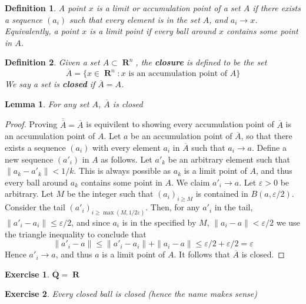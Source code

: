 \documentclass{report}
\newtheorem{lemma}[theorem]{Lemma}
\newtheorem{definition}{Definition}
\newtheorem{exercise}{Exercise}
\DeclareMathOperator{\real}{\mathbf{R}}
\begin{document}
\begin{definition}
  A point $x$ is a limit or accumulation point of a set $A$ if there exists a sequence $(a_i)$ such that every element is in the set $A$, and $a_i \to x$. Equivalently, a point $x$ is a limit point if every ball around $x$ contains some point in $A$.
\end{definition}

\begin{definition}
  Given a set $A \subset \real^n$, the {\bf closure} is defined to be the set
  \[ \overline{A} = \{ x \in \real^n : \text{$x$ is an accumulation point of $A$} \} \]
  We say a set is {\bf closed} if $\overline{A} = A$.
\end{definition}

\begin{lemma}
  For any set $A$, $\overline{A}$ is closed
\end{lemma}
\begin{proof}
  Proving $\overline{\overline{A}} = \overline{A}$ is equivilent to showing every accumulation point of $\overline{A}$ is an accumulation point of $A$. Let $a$ be an accumulation point of $\overline{A}$, so that there exists a sequence $(a_i)$ with every element $a_i$ in $\overline{A}$ such that $a_i \to a$. Define a new sequence $(a'_i)$ in $A$ as follows. Let $a'_k$ be an arbitrary element such that $\| a_k - a'_k \| < 1/k$. This is always possible as $a_k$ is a limit point of $A$, and thus every ball around $a_k$ contains some point in $A$. We claim $a'_i \to a$. Let $\varepsilon > 0$ be arbitrary. Let $M$ be the integer such that $(a_i)_{i \geq M}$ is contained in $B(a,\varepsilon/2)$. Consider the tail $(a'_i)_{i \geq \max(M,1/2\varepsilon)}$. Then, for any $a'_i$ in the tail, $\| a'_i - a_i \| \leq \varepsilon/2$, and since $a_i$ is in the specified by $M$, $\| a_i - a \| < \varepsilon/2$ we use the triangle inequality to conclude that
  \[ \| a'_i - a \| \leq \| a'_i - a_i \| + \| a_i - a \| \leq \varepsilon/2 + \varepsilon/2 = \varepsilon \]
  Hence $a'_i \to a$, and thus $a$ is a limit point of $A$. It follows that $\overline{A}$ is closed.
\end{proof}

\begin{exercise}
  $\overline{\mathbf{Q}} = \real$
\end{exercise}

\begin{exercise}
  Every closed ball is closed (hence the name makes sense)
\end{exercise}
\end{document}
